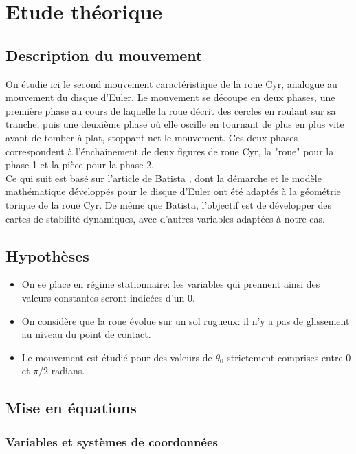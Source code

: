 \label{sec:Theme2}

\section{Etude théorique}
\subsection{Description du mouvement}
On étudie ici le second mouvement caractéristique de la roue Cyr, analogue au mouvement du disque d'Euler. Le mouvement se découpe en deux phases, une première phase au cours de laquelle la roue décrit des cercles en roulant sur sa tranche, puis une deuxième phase où elle oscille en tournant de plus en plus vite avant de tomber à plat, stoppant net le mouvement. Ces deux phases correspondent à l'énchainement de deux figures de roue Cyr, la "roue" pour la phase 1 et la pièce pour la phase 2. \\
Ce qui suit est basé sur l'article de Batista \cite{Batista}, dont la démarche et le modèle mathématique développés pour le disque d'Euler ont été adaptés à la géométrie torique de la roue Cyr. De même que Batista, l'objectif est de développer des cartes de stabilité dynamiques, avec d'autres variables adaptées à notre cas.

\subsection{Hypothèses}
\begin{itemize}
    \item On se place en régime stationnaire: les variables qui prennent ainsi des valeurs constantes seront indicées d'un 0.
    \item On considère que la roue évolue sur un sol rugueux: il n'y a pas de glissement au niveau du point de contact.
    \item Le mouvement est étudié pour des valeurs de $\theta_0$ strictement comprises entre 0 et $\pi/2$ radians.
\end{itemize}

\subsection{Mise en équations}
\subsubsection{Variables et systèmes de coordonnées}

